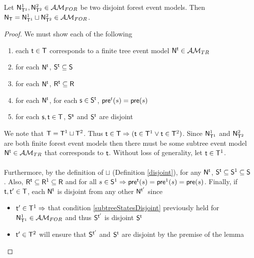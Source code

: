 \begin{lemma} \label{disjForestIsForest}
Let $\evM^1_{\evT^1}, \evM^2_{\evT^2} \in \forestClass$ be two disjoint forest event models.
Then $\evM_\evT = \evM^1_{\evT^1} \sqcup \evM^2_{\evT^2} \in \forestClass$.
\end{lemma}

\begin{proof}
We must show each of the following
\begin{enumerate}
	\item each $\evt \in \evT$ corresponds to a finite tree event model $\evM^\evt \in \treeClass$ \label{treeCorrespondence}
	\item for each $\evM^\evt$, $\evS^\evt \subseteq \evS$ \label{forestStateSubsets}
	\item for each $\evM^\evt$, $\evR^\evt \subseteq \evR$ \label{forestEdgeSubsets}
	\item for each $\evM^\evt$, for each $\evs \in \evS^\evt$, $\evpr^t(s) = \evpr(s)$ \label{preconMatch}
	\item for each $\evs, \evt \in \evT$, $\evS^\evs$ and $\evS^\evt$ are disjoint \label{subtreeStatesDisjoint}
\end{enumerate}

We note that $\evT = \evT^1 \sqcup \evT^2$.
Thus $\evt \in \evT \Rightarrow (\evt \in \evT^1 \lor \evt \in \evT^2)$.
Since $\evM^1_{\evT^1}$ and $\evM^2_{\evT^2}$ are both finite forest event models then there must be some
subtree event model $\evM^\evt \in \treeClass$ that corresponds to $\evt$.
Without loss of generality, let $\evt \in \evT^1$.\\
\\
Furthermore, by the definition of $\sqcup$ (Definition \ref{disjoint}), for any $\evM^\evt$, $\evS^\evt \subseteq \evS^1 \subseteq \evS$.
Also, $\evR^\evt \subseteq \evR^1 \subseteq \evR$ and for all $s \in \evS^1 \Rightarrow \evpr^\evt(s) = \evpr^1(s) =
\evpr(s)$.
Finally, if $\evt, \evt' \in \evT$, each $\evM^\evt$ is disjoint from any other $\evM^{\evt'}$ since
\begin{itemize}
	\item $\evt' \in \evT^1 \Rightarrow$ that condition \ref{subtreeStatesDisjoint} previously held for
	$\evM^1_{\evT^1} \in \forestClass$ and thus $\evS^{\evt'}$ is disjoint $\evS^\evt$
	\item $\evt' \in \evT^2$ will ensure that $\evS^{\evt'}$ and $\evS^\evt$ are disjoint by the premise of
	the lemma
\end{itemize}
\end{proof}

